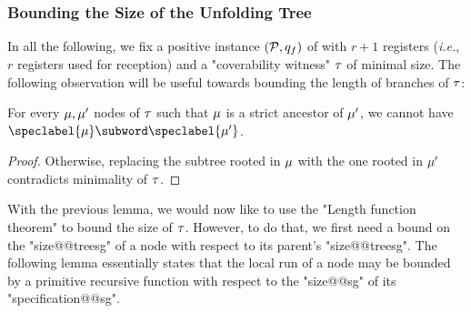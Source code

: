 \subsubsection{Bounding the Size of the Unfolding Tree}
In all the following, we fix a positive instance $(\mathcal{P},q_f)$ of \COVER with $r+1$ registers (\emph{i.e.}, $r$ registers used for reception) and a  "coverability witness" $\tau$ of minimal size.
The following observation will be useful towards bounding the length of branches of $\tau$:

\begin{lemma}
\label{lem:no_subword_in_branch_sg}
For every $\mu, \mu'$ nodes of $\tau$ such that $\mu$ is a strict ancestor of $\mu'$, we cannot have $\speclabel{\node} \subword \speclabel{\node'}$. 
\end{lemma}
\begin{proof}
Otherwise, replacing the subtree rooted in $\mu$ with the one rooted in $\mu'$ contradicts minimality of $\tau$.
\end{proof}

With the previous lemma, we would now like to use the "Length function theorem" to bound the size of $\tau$. However, to do that, we first need a bound on the "size@@treesg" of a node with respect to its parent's "size@@treesg". The following lemma essentially states that the local run of a node may be bounded by a primitive recursive function with respect to the "size@@sg" of its "specification@@sg".

